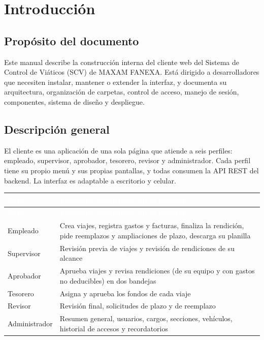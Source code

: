 \documentclass[11pt,letterpaper]{article}
\newcommand{\cabecera}{\rowcolor{maxamPrimario}}
\newcommand{\tth}[1]{\textcolor{white}{\textbf{#1}}}
\begin{document}
\section{Introducción}

\subsection{Propósito del documento}
Este manual describe la construcción interna del cliente web del Sistema de Control de Viáticos (SCV) de MAXAM FANEXA. Está dirigido a desarrolladores que necesiten instalar, mantener o extender la interfaz, y documenta su arquitectura, organización de carpetas, control de acceso, manejo de sesión, componentes, sistema de diseño y despliegue.

\subsection{Descripción general}
El cliente es una aplicación de una sola página que atiende a seis perfiles: empleado, supervisor, aprobador, tesorero, revisor y administrador. Cada perfil tiene su propio menú y sus propias pantallas, y todas consumen la API REST del backend. La interfaz es adaptable a escritorio y celular.

\begin{xltabular}{\textwidth}{L{3.2cm} Y}
\cabecera \tth{Perfil} & \tth{Funciones principales en la interfaz} \\
\endfirsthead
\cabecera \tth{Perfil} & \tth{Funciones principales en la interfaz} \\
\endhead
{} Empleado & Crea viajes, registra gastos y facturas, finaliza la rendición, pide reemplazos y ampliaciones de plazo, descarga su planilla \\
Supervisor & Revisión previa de viajes y revisión de rendiciones de su alcance \\
 Aprobador & Aprueba viajes y revisa rendiciones (de su equipo y con gastos no deducibles) en dos bandejas \\
Tesorero & Asigna y aprueba los fondos de cada viaje \\
 Revisor & Revisión final, solicitudes de plazo y de reemplazo \\
Administrador & Resumen general, usuarios, cargos, secciones, vehículos, historial de accesos y recordatorios \\
\end{xltabular}
\end{document}
